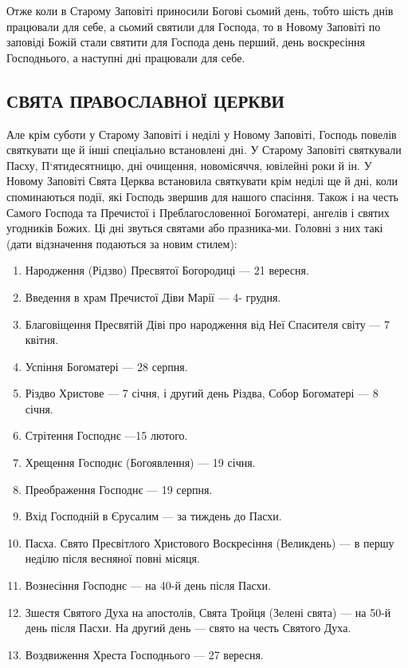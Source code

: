 \documentclass[main.tex]{subfiles}
\begin{document}
Отже коли в Старому Заповіті приносили Богові сьомий день, тобто шість днів працювали для себе, а сьомий святили для Господа, то в Новому Заповіті по заповіді Божій стали святити для Господа день перший, день воскресіння Господнього, а наступні дні працювали для себе.

\subsection{СВЯТА ПРАВОСЛАВНОЇ ЦЕРКВИ}

Але крім суботи у Старому Заповіті і неділі у Новому Заповіті, Господь повелів святкувати ще й інші спеціально встановлені дні. У Старому Заповіті святкували Пасху, П`ятидесятницю, дні очищення, новомісяччя, ювілейні роки й ін. У Новому Заповіті Свята Церква встановила святкувати крім неділі ще й дні, коли споминаються події, які Господь звершив для нашого спасіння. Також і на честь Самого Господа та Пречистої і Преблагословенної Богоматері, ангелів і святих угодників Божих. Ці дні звуться святами або празника-ми. Головні з них такі (дати відзначення подаються за новим стилем):
\begin{enumerate}
    \item Народження (Рідзво) Пресвятої Богородиці — 21 вересня.
    \item Введення в храм Пречистої Діви Марії — 4- грудня.
    \item Благовіщення Пресвятій Діві про народження від Неї Спасителя світу — 7 квітня.
    \item Успіння Богоматері — 28 серпня.
    \item Різдво Христове — 7 січня, і другий день Різдва, Собор Богоматері — 8 січня.
    \item Стрітення Господнє —15 лютого.
    \item Хрещення Господнє (Богоявлення) — 19 січня.
    \item Преображення Господнє — 19 серпня.
    \item Вхід Господній в Єрусалим — за тиждень до Пасхи.
    \item Пасха. Свято Пресвітлого Христового Воскресіння (Великдень) — в першу неділю після весняної повні місяця.
    \item Вознесіння Господнє — на 40-й день після Пасхи.
    \item Зшестя Святого Духа на апостолів, Свята Тройця (Зелені свята) — на 50-й день після Пасхи. На другий день — свято на честь Святого Духа.
    \item Воздвиження Хреста Господнього — 27 вересня.
\end{enumerate}
\end{document}

